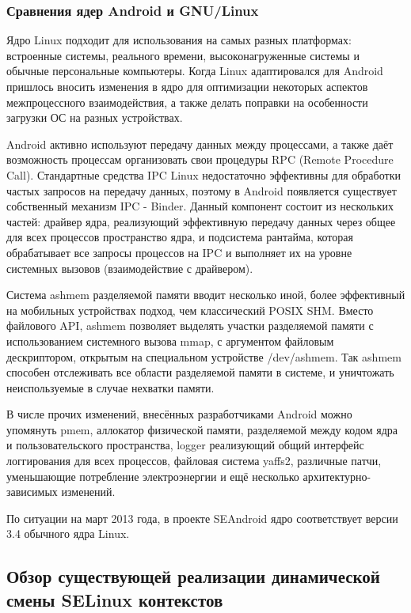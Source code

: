 \subsubsection{Сравнения ядер Android и GNU/Linux}

Ядро Linux подходит для использования на самых разных платформах:
встроенные системы, реального времени, высоконагруженные системы и
обычные персональные компьютеры. Когда Linux адаптировался для Android
пришлось вносить изменения в ядро для оптимизации некоторых аспектов
межпроцессного взаимодействия, а также делать поправки на особенности
загрузки ОС на разных устройствах.

Android активно используют передачу данных между процессами, а также
даёт возможность процессам организовать свои процедуры RPC (Remote
Procedure Call). Стандартные средства IPC Linux недостаточно эффективны
для обработки частых запросов на передачу данных, поэтому в Android
появляется существует собственный механизм IPC - Binder. Данный
компонент состоит из нескольких частей: драйвер ядра, реализующий
эффективную передачу данных через общее для всех процессов пространство
ядра, и подсистема рантайма, которая обрабатывает все запросы процессов
на IPC и выполняет их на уровне системных вызовов (взаимодействие с
драйвером).

Система ashmem разделяемой памяти вводит несколько иной, более
эффективный на мобильных устройствах подход, чем классический POSIX SHM.
Вместо файлового API, ashmem позволяет выделять участки разделяемой
памяти с использованием системного вызова mmap, с аргументом файловым
дескриптором, открытым на специальном устройстве /dev/ashmem. Так ashmem
способен отслеживать все области разделяемой памяти в системе, и
уничтожать неиспользуемые в случае нехватки памяти.

В числе прочих изменений, внесённых разработчиками Android можно
упомянуть pmem, аллокатор физической памяти, разделяемой между кодом
ядра и пользовательского пространства, logger реализующий общий
интерфейс логгирования для всех процессов, файловая система yaffs2,
различные патчи, уменьшающие потребление электроэнергии и ещё несколько
архитектурно-зависимых изменений.

По ситуации на март 2013 года, в проекте SEAndroid ядро соответствует 
версии 3.4 обычного ядра Linux.

\subsection{Обзор существующей реализации динамической смены SELinux
контекстов}

